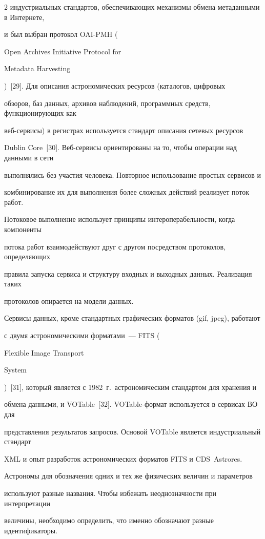 \begin{multicols}{2}
индустриальных стандартов, обеспечивающих механизмы обмена метаданными в Интернете, 

и был выбран протокол OAI-PMH ({Open Archives Initiative Protocol for 

Metadata Harvesting})~[29]. Для описания астрономических ресурсов (каталогов, цифровых 

обзоров, баз данных, архивов наблюдений, программных средств, функционирующих как 

      веб-сер\-ви\-сы) в регистрах используется стандарт описания сетевых ресурсов 

Dublin Core~[30]. Веб-сер\-ви\-сы ориентированы на то, чтобы операции над данными в сети 

выполнялись без участия человека. Повторное использование простых сервисов и 

комбинирование их для выполнения более сложных действий реализует поток работ. 

Потоковое выполнение использует принципы интероперабельности, когда компоненты 

потока работ взаимодействуют друг с другом посредством протоколов, опре\-де\-ля\-ющих 

правила запуска сервиса и структуру входных и выходных данных. Реализация таких 

протоколов опирается на модели данных. 

      

      Сервисы данных, кроме стандартных графических форматов (gif, jpeg), работают 

с двумя астрономическими форматами~--- FITS ({Flexible Image Transport 

System})~[31], который является с 1982~г.\ астрономическим стандартом для хранения и 

обмена данными, и VOTable~[32]. VOTable-фор\-мат используется в сервисах ВО для 

представления результатов запросов. Основой VOTable является индустриальный стандарт 

XML и опыт разработок астрономических форматов FITS и CDS\ Astrores. 

      

      Астрономы для обозначения одних и тех же физических величин и параметров 

используют \mbox{разные} названия. Чтобы избежать не\-од\-но\-знач\-ности при интерпретации 

величины, необходимо определить, что именно обозначают разные идентификаторы. 


\end{multicols}
